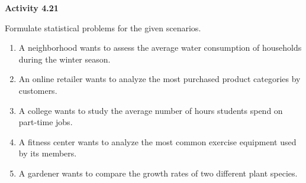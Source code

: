 \vspace{0.3ex}
\noindent\textbf{Activity 4.21}

\vspace{0.2ex}

Formulate statistical problems for the given scenarios. 

\begin{enumerate}
    \item A neighborhood wants to assess the average water consumption of households during the winter season. 
    \item An online retailer wants to analyze the most purchased product categories by customers. 
    \item A college wants to study the average number of hours students spend on part-time jobs. 
    \item A fitness center wants to analyze the most common exercise equipment used by its members. 
    \item A gardener wants to compare the growth rates of two different plant species. 
\end{enumerate}
